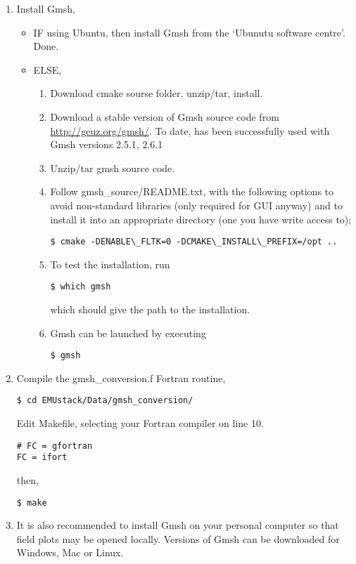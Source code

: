 \documentclass[11pt,a4paper,twoside]{report}
\begin{document}
\begin{enumerate}
\item Install Gmsh,
\begin{itemize}
\item IF using Ubuntu, then install Gmsh from the `Ubunutu software centre'. Done.

\item ELSE, 

\begin{enumerate}
\item Download cmake sourse folder, unzip/tar, install.
\item Download a stable version of Gmsh source code from \href{http://geuz.org/gmsh/}{http://geuz.org/gmsh/}.
To date, \CodeName has been successfully used with Gmsh versions 2.5.1, 2.6.1
\item Unzip/tar gmsh source code. 
\item Follow gmsh\_source/README.txt, with the following options to avoid non-standard libraries (only required for GUI anyway) and to install it into an appropriate directory (one you have write access to);
\begin{lstlisting}
$ cmake -DENABLE\_FLTK=0 -DCMAKE\_INSTALL\_PREFIX=/opt ..
\end{lstlisting}

\item To test the installation, run
\begin{lstlisting}
$ which gmsh 
\end{lstlisting}
which should give the path to the installation.

\item Gmsh can be launched by executing
\begin{lstlisting}
$ gmsh
\end{lstlisting}

\end{enumerate}
\end{itemize}


\item Compile the gmsh\_conversion.f Fortran routine,

\begin{lstlisting}
$ cd EMUstack/Data/gmsh_conversion/
\end{lstlisting}

Edit Makefile, selecting your Fortran compiler on line 10.
  
\begin{lstlisting}
# FC = gfortran
FC = ifort
\end{lstlisting}

then,

\begin{lstlisting}
$ make
\end{lstlisting}


\item It is also recommended to install Gmsh on your personal computer so that field plots may be opened locally. Versions of Gmsh can be downloaded for Windows, Mac or Linux.

\end{enumerate}
\end{document}

